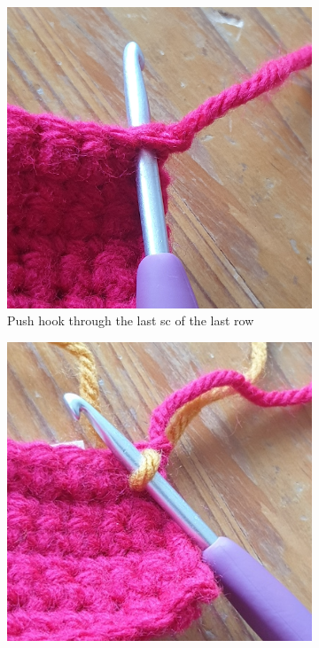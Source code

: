 \documentclass[openany]{book}
\begin{document}
\begin{figure}[H]\centering
\begin{subfigure}[t]{.3\textwidth}\centering
\includegraphics[width=.95\textwidth]{bk/slst1}
\caption{Push hook through the last sc of the last row}
\end{subfigure}
%
\begin{subfigure}[t]{.3\textwidth}
		\centering
		\includegraphics[width=.95\textwidth]{bk/slst2}

\end{subfigure}
\end{figure}
\end{document}
